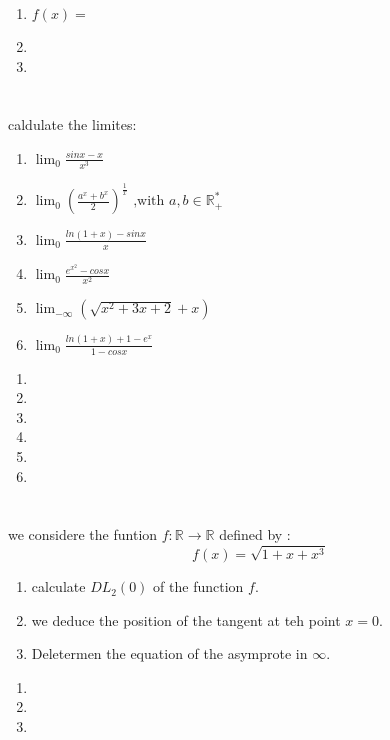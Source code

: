 \documentclass[12pt]{article}
\begin{document}
\begin{correctionbox}
	\begin{enumerate}
		\item  $f(x) =  $
		\item
		\item
	\end{enumerate}
\end{correctionbox}

\section{}
caldulate the limites:
\begin{enumerate}
	\item $\lim_0 \frac{sin x - x}{x^3}$
	\item $\lim_0 \left(\frac{a^x + b^x}{2}\right)^{\frac{1}{x}} \text{ ,with }  a, b \in \mathbb{R}^*_+$
	\item $\lim_0 \frac{ln(1+x) - sin x}{x}$
	\item $\lim_0 \frac{e^{x^2}- cos x}{x^2}$
	\item $\lim_{- \infty} (\sqrt{x^2 + 3x + 2} + x)$
	\item $\lim_0 \frac{ln(1+x) + 1 - e^x}{1 - cos x}$
\end{enumerate}

\begin{correctionbox}
	\begin{enumerate}
		\item
		\item
		\item
		\item
		\item
		\item
	\end{enumerate}
\end{correctionbox}

\section{}
we considere the funtion $f: \mathbb{R} \to \mathbb{R}$ defined by :
$$f(x) = \sqrt{1 + x + x^3}$$

\begin{enumerate}
	\item calculate $DL_2(0)$ of the function $f$.
	\item we deduce the position of the tangent at teh point $x = 0$.
	\item Deletermen the equation of the asymprote in $\infty$.
\end{enumerate}


\begin{correctionbox}
	\begin{enumerate}
		\item
		\item
		\item
	\end{enumerate}
\end{correctionbox}


\end{document}

